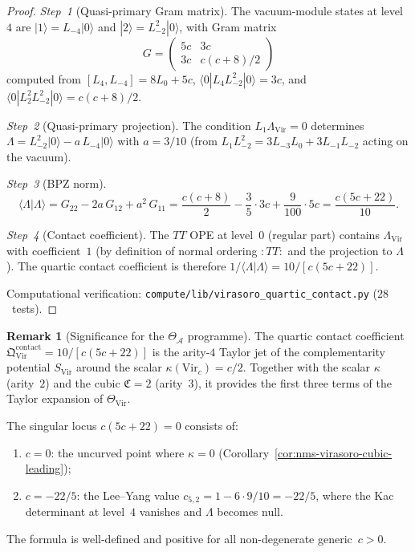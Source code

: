 \documentclass[11pt,oneside]{memoir}
\numberwithin{equation}{chapter}
\theoremstyle{definition}
\newtheorem{remark}[theorem]{Remark}
\newcommand{\cA}{\mathcal A}
\begin{document}
\begin{proof}
\emph{Step~1} (Quasi-primary Gram matrix).
The vacuum-module states at level~$4$ are
$|1\rangle = L_{-4}|0\rangle$ and
$|2\rangle = L_{-2}^2|0\rangle$, with Gram matrix
\[
G = \begin{pmatrix} 5c & 3c \\ 3c & c(c+8)/2 \end{pmatrix}
\]
computed from $[L_4, L_{-4}] = 8L_0 + 5c$,
$\langle 0|L_4 L_{-2}^2|0\rangle = 3c$, and
$\langle 0|L_2^2 L_{-2}^2|0\rangle = c(c+8)/2$.

\emph{Step~2} (Quasi-primary projection).
The condition $L_1 \Lambda_{\mathrm{Vir}} = 0$ determines
$\Lambda = L_{-2}^2|0\rangle - a\,L_{-4}|0\rangle$ with
$a = 3/10$ (from $L_1 L_{-2}^2 = 3L_{-3}L_0 + 3L_{-1}L_{-2}$
acting on the vacuum).

\emph{Step~3} (BPZ norm).
\[
\langle\Lambda|\Lambda\rangle
= G_{22} - 2a\,G_{12} + a^2\,G_{11}
= \frac{c(c+8)}{2} - \frac{3}{5}\cdot 3c + \frac{9}{100}\cdot 5c
= \frac{c(5c+22)}{10}.
\]

\emph{Step~4} (Contact coefficient).
The $TT$ OPE at level~$0$ (regular part) contains
$\Lambda_{\mathrm{Vir}}$ with coefficient~$1$
(by definition of normal ordering $:TT:$ and the projection to
$\Lambda$).  The quartic contact coefficient is therefore
$1/\langle\Lambda|\Lambda\rangle = 10/[c(5c+22)]$.

Computational verification:
\texttt{compute/lib/virasoro\_quartic\_contact.py} ($28$~tests).
\end{proof}

\begin{remark}[Significance for the $\Theta_\cA$ programme]
\label{rem:quartic-theta-significance}
The quartic contact coefficient
$\mathfrak Q^{\mathrm{contact}}_{\mathrm{Vir}} = 10/[c(5c+22)]$
is the arity-$4$ Taylor jet of the complementarity potential
$S_{\mathrm{Vir}}$ around the scalar $\kappa(\mathrm{Vir}_c) = c/2$.
Together with the scalar $\kappa$ (arity~$2$) and the cubic
$\mathfrak C = 2$ (arity~$3$), it provides the first three terms of
the Taylor expansion of $\Theta_{\mathrm{Vir}}$.

The singular locus $c(5c+22) = 0$ consists of:
\begin{enumerate}[label=\textup{(\alph*)}]
\item $c = 0$: the uncurved point where
  $\kappa = 0$ (Corollary~\textup{\ref{cor:nms-virasoro-cubic-leading}});
\item $c = -22/5$: the Lee--Yang value
  $c_{5,2} = 1 - 6 \cdot 9/10 = -22/5$, where the Kac determinant
  at level~$4$ vanishes and $\Lambda$ becomes null.
\end{enumerate}
The formula is well-defined and positive for all non-degenerate
generic~$c > 0$.
\end{remark}
\end{document}
